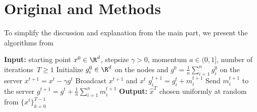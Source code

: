 \documentclass{article}
\begin{document}



\section{Original  and  Methods}
To simplify the discussion and explanation from the main part, we present the algorithms from \citep{tyurin2022dasha}

\begin{algorithm*}
  \caption{}
  \label{alg:main_algorithm_dasha}
  \begin{algorithmic}[1]
  \STATE \textbf{Input:} starting point $x^0 \in \R^d$, stepsize $\gamma > 0$, momentum $a \in (0, 1]$, 
  number of iterations~$T \geq 1$
  \STATE Initialize $g^0_i\in \R^d$ on the nodes and  $g^0 = \frac{1}{n}\sum_{i=1}^n g^0_i$ on the server
  \STATE $x^{t+1} = x^t - \gamma g^t$
  \STATE Broadcast $x^{t+1}$ and $x^{t}$
  \STATE $g^{t+1}_i = g^{t}_i + m^{t+1}_i$
  \STATE Send $m^{t+1}_i$ to the server
  \ENDFOR
  \STATE $g^{t+1} = g^t + \frac{1}{n} \sum_{i=1}^n m^{t+1}_i$
  \ENDFOR
  \STATE \textbf{Output:} $\hat{x}^T$ chosen uniformly at random from $\{x^t\}_{k=0}^{T-1}$ 
  \end{algorithmic}
\end{algorithm*}
\end{document}
